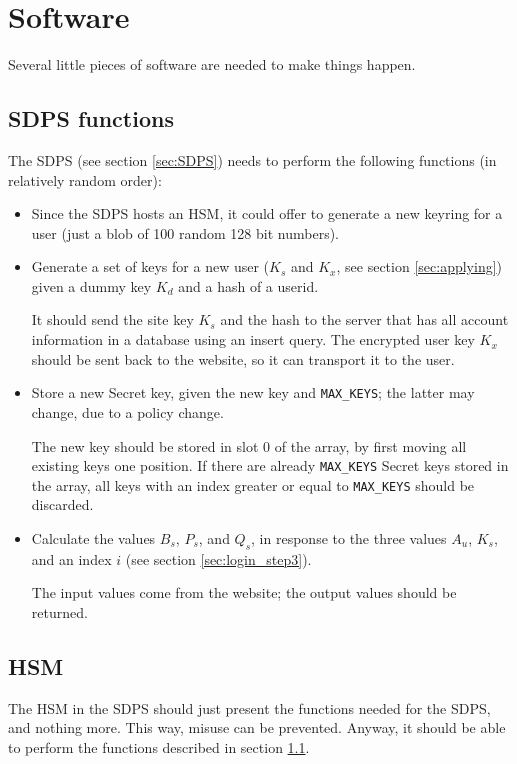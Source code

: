 \section{Software}
Several little pieces of software are needed to make things happen.

\subsection{SDPS functions}
\label{sec:sdps_functions}
The SDPS (see section \ref{sec:SDPS}) needs to perform the following functions (in relatively random order):
\begin{itemize}
\item Since the SDPS hosts an HSM,
it could offer to generate a new keyring for a user
(just a blob of 100 random 128 bit numbers).
\item Generate a set of keys for a new user ($K_s$ and $K_x$,
see section \ref{sec:applying}) given a dummy key $K_d$ and a \SHA hash of a userid.
\par
It should send the site key $K_s$ and the hash to the server that has all account information in a database using an insert query.
The encrypted user key $K_x$ should be sent back to the website, so it can transport it to the user.
\item Store a new Secret key,
given the new key and \texttt{MAX\_KEYS};
the latter may change,
due to a policy change.
\par
The new key should be stored in slot 0 of the array, by first moving all existing keys one position.
If there are already \texttt{MAX\_KEYS} Secret keys stored in the array,
all keys with an index greater or equal to \texttt{MAX\_KEYS} should be discarded.
\item Calculate the values $B_s$, $P_s$, and $Q_s$,
in response to the three values $A_u$, $K_s$,
and an index $i$ (see section \ref{sec:login_step3}).
\par The input values come from the website;
the output values should be returned.
\end{itemize}

\subsection{HSM}
The HSM in the SDPS should just present the functions needed for the SDPS,
and nothing more.
This way,
misuse can be prevented.
Anyway, it should be able to perform the functions described in section \ref{sec:sdps_functions}.

